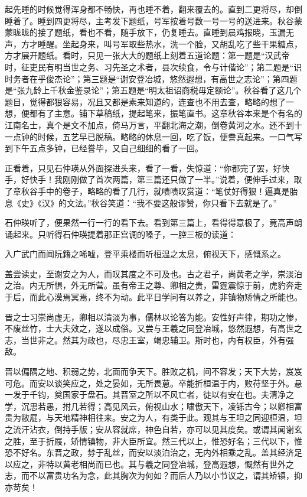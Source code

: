 \documentclass[12pt,UTF8]{ctexbook}
\begin{document}
{{{起先睡的时候觉得浑身都不畅快，再也睡不着，翻来覆去的。直到二更将尽，却倒睡着了。睡到四更将尽，主考发下题纸，号军按着号数一号一号的送进来。秋谷蒙蒙眬眬的接了题纸，看也不看，随手放下，仍复睡去。直睡到晨鸡报晓，玉漏无声，方才睡醒。坐起身来，叫号军取些热水，洗一个脸，又胡乱吃了些干果糖点，方才展开题纸。看时，只见一张大大的题纸上刻着五道论题：第一题是“汉武帝时，征吏民有明当世之务、习先圣之术者，县次续食，令与计偕论”；第二题是“识时务者在乎俊杰论”；第三题是“谢安登冶城，悠然遐想，有高世之志论”；第四题是“张九龄上千秋金鉴录论”；第五题是“明太祖诏商税毋定额论”。秋谷看了这几个题目，觉得都狠容易，况且又都是素来知道的，连查也不用去查，略略的想了一想，便都有了主意。铺下草稿纸，提起笔来，振笔直书。这章秋谷本来是个有名的江南名士，真个是文不加点，倚马万言，平翻北海之潮，倒卷黄河之水。还不到十一点钟的时候，五艺早已脱稿。略略的休息一回，吃了饭，便誊真起来。一口气写到下午五点多钟，已经誊毕，又自己细细的看了一回。

正看着，只见石仲瑛从外面探进头来，看了一看，失惊道：“你都完了罢，好快手，好快手！我刚刚做了首次两篇，第三篇还只做了一半。”说着，便伸手过来，取了章秋谷手中的卷子，略略的看了几行，就啧啧叹赏道：“笔仗好得狠！逼真是胎息《史》《汉》的文法。”秋谷笑道：“我不要这般谬赞，你只看下去就是了。”

石仲瑛听了，便果然一行一行的看下去。看到第三篇上，看得得意极了，竟高声朗诵起来。只听得石仲瑛提着那正宫调的嗓子，一腔三板的读道：

入广武门而闻阮籍之唏嘘，登平乘楼而听桓温之太息，俯视天下，感慨系之。

盖尝读史，至谢安之为人，而叹其度之不可及也。古之君子，尚黄老之学，崇淡泊之治。内无所惧，外无所营。虽有帝王之尊、卿相之贵，雷霆震惊于前，虎豹奔走于后，而此心漠焉冥焉，终不为动。此平日学问有以养之，非镇物矫情之所能也。

晋之士习崇尚虚无，卿相以清淡为事，儒林以论答为能。安性好声律，期功之惨，不废丝竹，士大夫效之，遂以成俗。又尝与王羲之同登冶城，悠然遐想，有高世之志，当世非之。然其为政也，尽忠王室，竭忠辅卫。斯时也，内有权臣，外有强敌。

晋以偏隅之地、积弱之势，北面而争天下。胜败之机，间不容发；天下大势，岌岌可危。而安以谈笑应之，处之晏如，无所畏葸。卒能折桓温于内，败苻坚于外。悬一发于千钧，奠国家于盘石。其晋室之所以不风亡者，徒以有安在也。夫清净之学，沉思若愚，拊几若得；高见风云，俯视山水；啸傲天下，凌铄古今；以卿相富贵为敝屣，与天地精神相往来。安之为人，有类于此。观其与王坦之同迎桓温，坦之流汗沾衣，倒持手版；安从容就席，神色自若，亦可以见其度矣。或谓其闻谢玄之胜，至于折屐，矫情镇物，非大臣所宜。然三代以上，惟恐好名；三代以下，惟恐不好名。东晋之政，棼于乱丝，而安以淡泊治之，无内外相乘之乱。盖其经济足以应之，非特以黄老相尚而已也。其与羲之同登冶城，登高遐想，慨然有世外之志，而不以富贵功名为念，此其胸次为何如？而后人乃以小节议之，谓其矫镇，抑亦苛矣！

}}}
\end{document}
